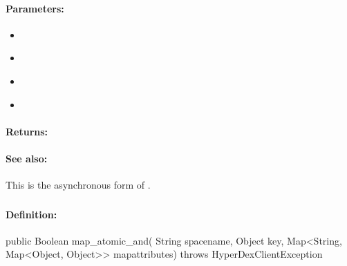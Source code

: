 \paragraph{Parameters:}
\begin{itemize}[noitemsep]
\item {}\\

\item {}\\

\item {}\\

\item {}\\

\end{itemize}

\paragraph{Returns:}


\paragraph{See also:}  This is the asynchronous form of .

\pagebreak
\subsubsection{}
\label{api:java:map_atomic_and}


\paragraph{Definition:}
\begin{javacode}
public Boolean map_atomic_and(
        String spacename,
        Object key,
        Map<String, Map<Object, Object>> mapattributes) throws HyperDexClientException
\end{javacode}

